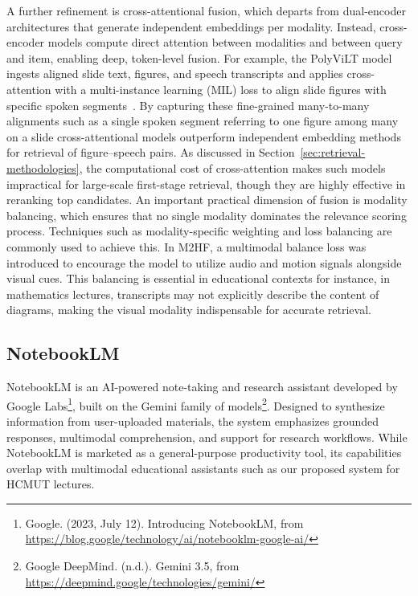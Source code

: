 A further refinement is cross-attentional fusion, which departs from dual-encoder architectures that generate independent embeddings per modality. Instead, cross-encoder models compute direct attention between modalities and between query and item, enabling deep, token-level fusion. For example, the PolyViLT model ingests aligned slide text, figures, and speech transcripts and applies cross-attention with a multi-instance learning (MIL) loss to align slide figures with specific spoken segments~\cite{lee2023lpm}. By capturing these fine-grained many-to-many alignments such as a single spoken segment referring to one figure among many on a slide cross-attentional models outperform independent embedding methods for retrieval of figure–speech pairs. As discussed in Section~\ref{sec:retrieval-methodologies}, the computational cost of cross-attention makes such models impractical for large-scale first-stage retrieval, though they are highly effective in reranking top candidates. An important practical dimension of fusion is modality balancing, which ensures that no single modality dominates the relevance scoring process. Techniques such as modality-specific weighting and loss balancing are commonly used to achieve this. In M2HF, a multimodal balance loss was introduced to encourage the model to utilize audio and motion signals alongside visual cues. This balancing is essential in educational contexts for instance, in mathematics lectures, transcripts may not explicitly describe the content of diagrams, making the visual modality indispensable for accurate retrieval.

\subsection{NotebookLM}

NotebookLM is an AI-powered note-taking and research assistant developed by Google Labs\footnote{Google. (2023, July 12). Introducing NotebookLM, from \url{https://blog.google/technology/ai/notebooklm-google-ai/}}, built on the Gemini family of models\footnote{Google DeepMind. (n.d.). Gemini 3.5, from \url{https://deepmind.google/technologies/gemini/}}. Designed to synthesize information from user-uploaded materials, the system emphasizes grounded responses, multimodal comprehension, and support for research workflows. While NotebookLM is marketed as a general-purpose productivity tool, its capabilities overlap with multimodal educational assistants such as our proposed system for HCMUT lectures.

